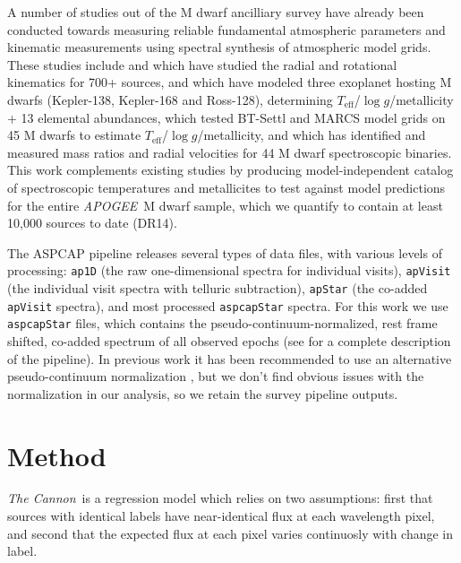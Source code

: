 \documentclass[twocolumn]{aastex62}
\newcommand{\apogee}{\textsl{APOGEE}}
\newcommand{\thecannon}{\textsl{The Cannon}}
\newcommand{\teff}{T_{\mathrm{eff}}}
\newcommand{\logg}{\log g}
\begin{document}
A number of studies out of the M dwarf ancilliary survey have already been conducted towards measuring reliable fundamental atmospheric parameters and kinematic measurements using spectral synthesis of atmospheric model grids. 
These studies include \citealt{Desphande:2013} and \citealt{Gilhool:2018} which have studied the radial and rotational kinematics for 700+ sources,
\citealt{Souto:2017} and \citealt{Souto:2018} which have modeled three exoplanet hosting M dwarfs (Kepler-138, Kepler-168 and Ross-128), determining $\teff$/$\logg$/metallicity + 13 elemental abundances,
\citealt{Rajpurohit:2018} which tested BT-Settl \citep{Allard:2012} and MARCS \citep{Gustafsson:2008} model grids on 45 M dwarfs to estimate $\teff$/$\logg$/metallicity,
and \citealt{Skinner:2018} which has identified and measured mass ratios and radial velocities for 44 M dwarf spectroscopic binaries.
This work complements existing studies by producing model-independent catalog of spectroscopic temperatures and metallicites to test against model predictions for the entire \apogee\ M dwarf sample, which we quantify to contain at least 10,000 sources to date (DR14).

The ASPCAP pipeline releases several types of data files, with various levels of processing: {\tt\string ap1D} (the raw one-dimensional spectra for individual visits), {\tt\string apVisit} (the individual visit spectra with telluric subtraction), {\tt\string apStar} (the co-added {\tt\string apVisit} spectra), and most processed {\tt\string aspcapStar} spectra. For this work we use {\tt\string aspcapStar} files, which contains the pseudo-continuum-normalized, rest frame shifted, co-added spectrum of all observed epochs (see \citealt{Perez:2016} for a complete description of the pipeline).
In previous work it has been recommended to use an alternative pseudo-continuum normalization \citep{Ness:2015}, but we don't find obvious issues with the normalization in our analysis, so we retain the survey pipeline outputs.

\section{Method} \label{sec:methods}

\thecannon\ is a regression model which relies on two assumptions: first that sources with identical labels have near-identical flux at each wavelength pixel, and second that the expected flux at each pixel varies continuosly with change in label. 
\end{document}
